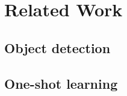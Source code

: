 %
\chapter{Related Work}
\label{sec:related}

\section{Object detection}
\label{sec:related:detection}
\begin{my_list}
    \item \citet{girshick_rich_2014}
    \item \citet{girshick_fast_2015}
    \item \citet{ren_faster_2015}
    \item \citet{he_mask_2017}
    \item \citet{redmon_yolo9000:_2016}
    \item \citet{dai_r-fcn:_2016}
    \item \citet{liu_ssd:_2016}
\end{my_list}
\blindtext[2]

\section{One-shot learning}
\label{sec:related:oneshot}
\blindtext[2]

